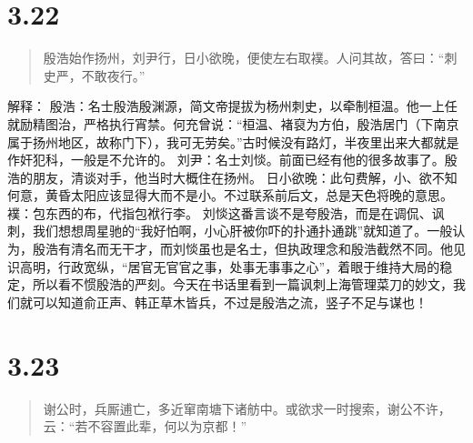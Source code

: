 \documentclass[]{book}
\begin{document}
\section{3.22}\label{section-176}

\begin{quote}
殷浩始作扬州，刘尹行，日小欲晚，便使左右取襆。人问其故，答曰：``刺史严，不敢夜行。''
\end{quote}

解释：
殷浩：名士殷浩殷渊源，简文帝提拔为杨州刺史，以牵制桓温。他一上任就励精图治，严格执行宵禁。何充曾说：``桓温、褚裒为方伯，殷浩居门（下南京属于扬州地区，故称门下），我可无劳矣。''古时候没有路灯，半夜里出来大都就是作奸犯科，一般是不允许的。
刘尹：名士刘惔。前面已经有他的很多故事了。殷浩的朋友，清谈对手，他当时大概住在扬州。
日小欲晚：此句费解，小、欲不知何意，黄昏太阳应该显得大而不是小。不过联系前后文，总是天色将晚的意思。
襆：包东西的布，代指包袱行李。
刘惔这番言谈不是夸殷浩，而是在调侃、讽刺，我们想想周星驰的``我好怕啊，小心肝被你吓的扑通扑通跳''就知道了。一般认为，殷浩有清名而无干才，而刘惔虽也是名士，但执政理念和殷浩截然不同。他见识高明，行政宽纵，``居官无官官之事，处事无事事之心''，着眼于维持大局的稳定，所以看不惯殷浩的严刻。今天在书话里看到一篇讽刺上海管理菜刀的妙文，我们就可以知道俞正声、韩正草木皆兵，不过是殷浩之流，竖子不足与谋也！

\section{3.23}\label{section-177}

\begin{quote}
谢公时，兵厮逋亡，多近窜南塘下诸舫中。或欲求一时搜索，谢公不许，云：``若不容置此辈，何以为京都！''
\end{quote}
\end{document}
